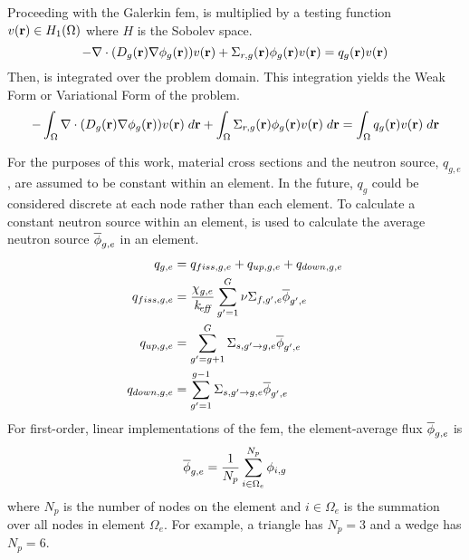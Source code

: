     Proceeding with the Galerkin \gls{fem},  is
    multiplied by a testing function $v(\mathbf{r}) \in H_1(\Omega)$ where $H$ is the
    Sobolev space. 
    \begin{equation}
      \label{eq:testing_function_multiply}
      -\mathbf{\nabla} \cdot (D_g(\mathbf{r}) \mathbf{\nabla} \phi_g(\mathbf{r})) v(\mathbf{r}) + 
        \Sigma_{r,g}(\mathbf{r}) \phi_g(\mathbf{r}) v(\mathbf{r}) =
        q_g(\mathbf{r}) v(\mathbf{r})
    \end{equation}
    Then,  is integrated over the problem 
    domain. This integration yields the Weak Form or Variational Form of the 
    problem.
    \begin{equation}
      \label{eq:fem_weak_form}
      - \int_{\Omega} \mathbf{\nabla} \cdot (D_g(\mathbf{r}) \mathbf{\nabla} \phi_g(\mathbf{r})) v(\mathbf{r}) \; d\mathbf{r}
        + \int_{\Omega} \Sigma_{r,g}(\mathbf{r}) \phi_g(\mathbf{r}) v(\mathbf{r}) \;d\mathbf{r}=
        \int_{\Omega} q_g(\mathbf{r}) v(\mathbf{r}) \;d\mathbf{r}
    \end{equation}
    
    For the purposes of this work, material cross sections and the neutron
    source, $q_{g,e}$, are assumed to be constant within an element. In the
    future, $q_g$ could be considered discrete at each node rather than each
    element. To calculate a constant neutron source within an element,
     is used to calculate the average neutron source $\overline{\phi}_{g,e}$
    in an element.
    \begin{align}
      q_{g,e} &= q_{fiss,g,e} + q_{up,g,e} + q_{down,g,e} \\
      \label{eq:qelement_fiss}
      q_{fiss,g,e} &= \frac{\chi_{g,e}}{k_{\!\mbox{\scriptsize \em eff}}} \sum_{g'=1}^G \nu
        \Sigma_{f,g',e} \overline{\phi}_{g',e} \\
      \label{eq:qelement_up}
      q_{up,g,e} &= \sum_{g'=g+1}^G \Sigma_{s,g' \rightarrow g,e}
        \overline{\phi}_{g',e}\\
      \label{eq:qelement_down}
      q_{down,g,e} &= \sum_{g'=1}^{g-1} \Sigma_{s,g' \rightarrow g,e}
        \overline{\phi}_{g',e}
    \end{align}
    For first-order, linear implementations of the \gls{fem}, the
    element-average flux $\overline{\phi}_{g,e}$ is
    \begin{equation}
      \label{eq:phiavg}
      \overline{\phi}_{g,e} = \frac{1}{N_p} \sum_{i \in \Omega_e}^{N_p} \phi_{i,g}
    \end{equation}
    where $N_p$ is the number of nodes on the element and $i \in
    \Omega_e$ is the summation over all nodes in element $\Omega_e$. For 
    example, a triangle has $N_p = 3$ and a wedge has $N_p = 6$.

